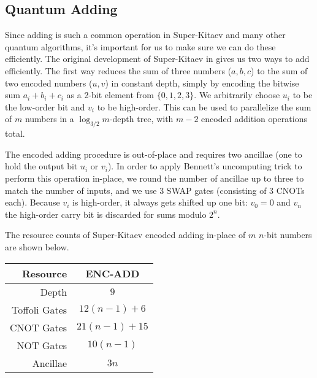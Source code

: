 \subsection{Quantum Adding}
\label{subsec:add}

Since adding is such a common
operation in Super-Kitaev and many other quantum algorithms, it's important
for us to make sure we can do these efficiently.
The original development of Super-Kitaev in \cite{ksv02} gives us two
ways to add efficiently.
The first way reduces the sum of three numbers ($a,b,c$) to the sum of
two encoded numbers ($u,v$) in constant depth, simply by encoding the
bitwise sum $a_i+b_i+c_i$ as a 2-bit element from $\{0,1,2,3\}$. We arbitrarily
choose $u_i$ to be the low-order bit and $v_i$ to be high-order.
This can be used to parallelize the sum of $m$ numbers in
a $\log_{3/2}m$-depth tree, with $m-2$ encoded addition operations total.




The encoded adding procedure is out-of-place and requires two ancillae
(one to hold the output bit $u_i$ or $v_i$). In order to apply
Bennett's uncomputing trick to perform this operation in-place, we round
the number of ancillae up to three to match the number of inputs, and we
use 3 SWAP gates (consisting of 3 CNOTs each). Because $v_i$ is high-order,
it always gets shifted up one bit: $v_0 = 0$ and $v_n$ the high-order carry
bit is discarded for sums modulo $2^n$.

The resource counts of Super-Kitaev encoded adding in-place
of $m$ $n$-bit numbers
are shown below.

\begin{center}
\begin{tabular}{|r|c|}
\hline
Resource      & ENC-ADD         \\ %
\hline
Depth         & $9$             \\ %
Toffoli Gates & $12 (n-1) + 6$  \\ %
CNOT Gates    & $21 (n-1) + 15$ \\ %
NOT Gates     & $10 (n-1)$      \\ %
Ancillae      & $3n$            \\ %
\hline
\end{tabular}
\end{center}

